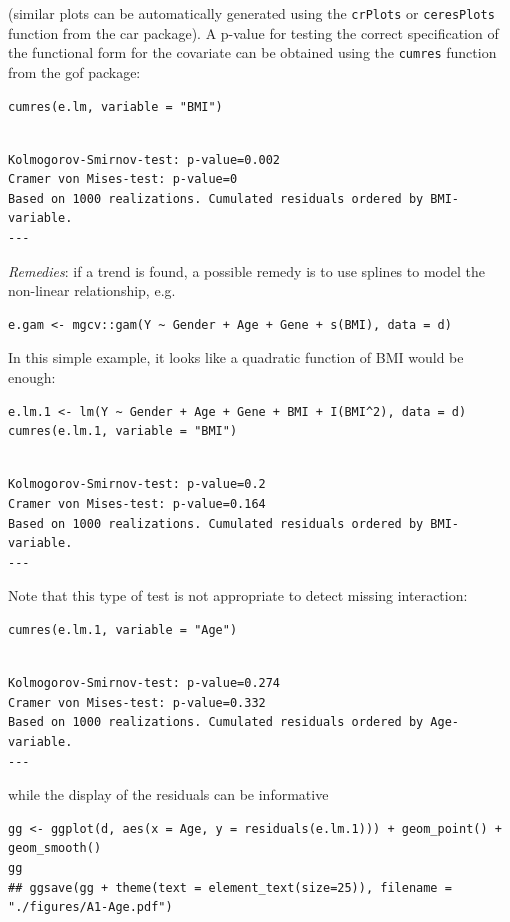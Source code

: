 \documentclass[12pt]{article}
\begin{document}
(similar plots can be automatically generated using the \texttt{crPlots} or
\texttt{ceresPlots} function from the car package). A p-value for testing the correct
specification of the functional form for the covariate can be obtained
using the \texttt{cumres} function from the gof package:
\lstset{language=r,label= ,caption= ,captionpos=b,numbers=none}
\begin{lstlisting}
cumres(e.lm, variable = "BMI")
\end{lstlisting}

\begin{verbatim}

Kolmogorov-Smirnov-test: p-value=0.002
Cramer von Mises-test: p-value=0
Based on 1000 realizations. Cumulated residuals ordered by BMI-variable.
---
\end{verbatim}

\emph{Remedies}: if a trend is found, a possible remedy is to use splines to model the
non-linear relationship, e.g. 
\lstset{language=r,label= ,caption= ,captionpos=b,numbers=none}
\begin{lstlisting}
e.gam <- mgcv::gam(Y ~ Gender + Age + Gene + s(BMI), data = d)
\end{lstlisting}
In this simple example, it looks like a quadratic function of BMI
would be enough:
\lstset{language=r,label= ,caption= ,captionpos=b,numbers=none}
\begin{lstlisting}
e.lm.1 <- lm(Y ~ Gender + Age + Gene + BMI + I(BMI^2), data = d)
cumres(e.lm.1, variable = "BMI")
\end{lstlisting}

\begin{verbatim}

Kolmogorov-Smirnov-test: p-value=0.2
Cramer von Mises-test: p-value=0.164
Based on 1000 realizations. Cumulated residuals ordered by BMI-variable.
---
\end{verbatim}
Note that this type of test is not appropriate to detect missing
interaction:
\lstset{language=r,label= ,caption= ,captionpos=b,numbers=none}
\begin{lstlisting}
cumres(e.lm.1, variable = "Age")
\end{lstlisting}

\begin{verbatim}

Kolmogorov-Smirnov-test: p-value=0.274
Cramer von Mises-test: p-value=0.332
Based on 1000 realizations. Cumulated residuals ordered by Age-variable.
---
\end{verbatim}
while the display of the residuals can be informative
\lstset{language=r,label= ,caption= ,captionpos=b,numbers=none}
\begin{lstlisting}
gg <- ggplot(d, aes(x = Age, y = residuals(e.lm.1))) + geom_point() + geom_smooth()
gg
## ggsave(gg + theme(text = element_text(size=25)), filename = "./figures/A1-Age.pdf")
\end{lstlisting}
\end{document}
